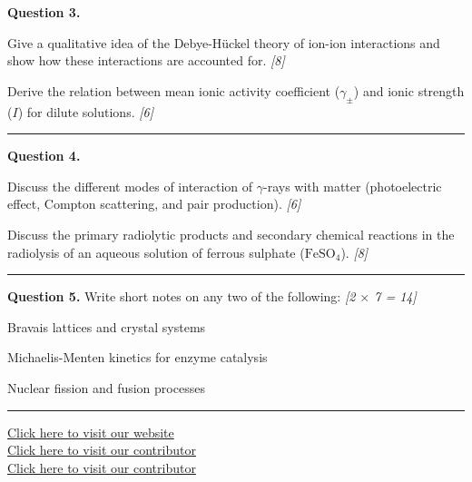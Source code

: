\documentclass[11pt,a4paper]{article}
\newcommand{\pts}[1]{\hfill   \textit{[#1]}}
\begin{document}
\noindent   \textbf{Question 3.}

\begin{parts}
  \item Give a qualitative idea of the Debye-H\"uckel theory of ion-ion interactions and show how these interactions are accounted for. \pts{8}
  \item Derive the relation between mean ionic activity coefficient ($\gamma_\pm$) and ionic strength ($I$) for dilute solutions. \pts{6}
\end{parts}

\medskip\rule{\linewidth}{0.2pt}




\noindent   \textbf{Question 4.}

\begin{parts}
  \item Discuss the different modes of interaction of $\gamma$-rays with matter (photoelectric effect, Compton scattering, and pair production). \pts{6}
  \item Discuss the primary radiolytic products and secondary chemical reactions in the radiolysis of an aqueous solution of ferrous sulphate ($ \text{FeSO}_4$). \pts{8}
\end{parts}

\medskip\rule{\linewidth}{0.2pt}




\noindent   \textbf{Question 5.} Write short notes on any two of the following: \pts{2 $ \times$ 7 = 14}

\begin{parts}
  \item Bravais lattices and crystal systems
  \item Michaelis-Menten kinetics for enzyme catalysis
  \item Nuclear fission and fusion processes
\end{parts}

\vfill
\rule{\linewidth}{0.4pt}

\begin{center}\small
  \href{https://bhu-exam.vercel.app/}{Click here to visit our website}\\[4pt]
  \href{https://me-aryan.vercel.app/}{Click here to visit our contributor}\\[4pt]
  \href{https://quashan-me.vercel.app/}{Click here to visit our contributor}
\end{center}
\end{document}
